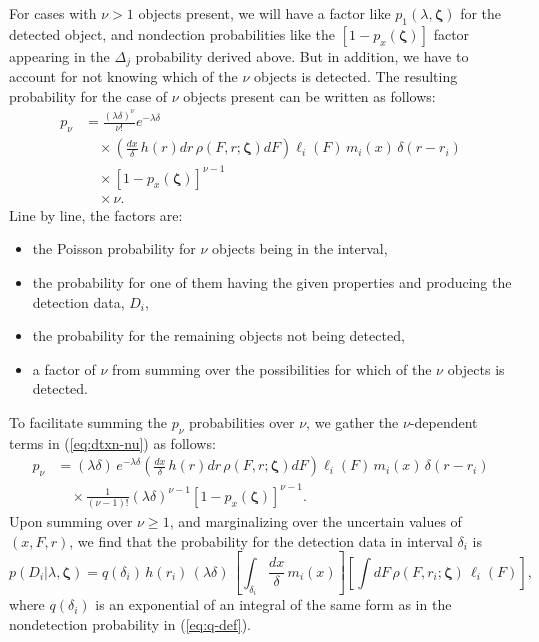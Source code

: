 \documentclass[12pt]{article}
\numberwithin{equation}{section}
\numberwithin{figure}{section}
\numberwithin{table}{section}
\newcommand{\rhopar}{\boldsymbol{\zeta}}
\begin{document}
For cases with $\nu > 1$ objects present, we will have a factor like $p_1(\lambda,\rhopar)$ for the detected object, and nondection probabilities like the $[1 - p_x(\rhopar)]$ factor appearing in the $\Delta_j$ probability derived above.
But in addition, we have to account for not knowing which of the $\nu$ objects is detected.
The resulting probability for the case of $\nu$ objects present can be written as follows:
\begin{equation}\label{eq:dtxn-nu}
\begin{split}
p_\nu
  &= \frac{(\lambda\delta)^\nu}{\nu!}  e^{-\lambda\delta}\\
  &\quad \times \left(\frac{dx}{\delta}\, h(r)dr\, \rho(F,r;\rhopar)dF\right) \ell_i(F)\, m_i(x)\, \delta(r - r_i) \\
  &\quad \times \left[1 - p_x(\rhopar)\right]^{\nu-1}\\
  &\quad \times \nu.
\end{split}
\end{equation}
Line by line, the factors are:
\begin{itemize}
\item the Poisson probability for $\nu$ objects being in the interval,
\item the probability for one of them having the given properties and
producing the detection data, $D_i$,
\item the probability for the remaining objects not being detected,
\item a factor of $\nu$ from summing over the possibilities for
which of the $\nu$ objects is detected.
\end{itemize}
To facilitate summing the $p_\nu$ probabilities over $\nu$, we gather the $\nu$-dependent terms in (\ref{eq:dtxn-nu}) as follows:
\begin{equation}\label{eq:dtxn-nu2}
\begin{split}
p_\nu
  &= (\lambda\delta)\,  e^{-\lambda\delta}
  \left(\frac{dx}{\delta}\, h(r)dr\, \rho(F,r;\rhopar)dF\right) \ell_i(F)\, m_i(x)\, \delta(r - r_i) \\
  &\quad \times \frac{1}{(\nu-1)!}(\lambda\delta)^{\nu-1}
    \left[1 - p_x(\rhopar)\right]^{\nu-1}.
\end{split}
\end{equation}
Upon summing over $\nu \ge 1$, and marginalizing over the uncertain values of $(x,F,r)$, we find that the probability for the detection data in interval $\delta_i$ is
\begin{equation}\label{eq:p-dtxn}
p(D_i|\lambda,\rhopar) =
  q(\delta_i)\, h(r_i)\, (\lambda\delta)\,
  \left[\int_{\delta_i}\frac{dx}{\delta}\, m_i(x)\right]
  \left[\int dF\, \rho(F,r_i;\rhopar)\, \ell_i(F)\right],
\end{equation}
where $q(\delta_i)$ is an exponential of an integral of the same form as in the nondetection probability in (\ref{eq:q-def}).
\end{document}
